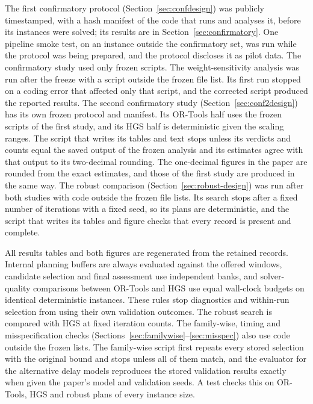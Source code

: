 \documentclass[11pt,a4paper]{article}
\begin{document}
The first confirmatory protocol (Section~\ref{sec:confdesign}) was publicly
timestamped, with a hash manifest of the code that runs and analyses it, before
its instances were solved; its results are in Section~\ref{sec:confirmatory}. One
pipeline smoke test, on an instance outside the confirmatory set, was run while
the protocol was being prepared, and the protocol discloses it as pilot data. The
confirmatory study used only frozen scripts. The weight-sensitivity analysis was
run after the freeze with a script outside the frozen file list. Its first run
stopped on a coding error that affected only that script, and the corrected
script produced the reported results. The second confirmatory study
(Section~\ref{sec:conf2design}) has its own frozen protocol and manifest. Its
OR-Tools half uses the frozen scripts of the first study, and its HGS half is
deterministic given the scaling ranges. The script that writes its tables and
text stops unless its verdicts and counts equal the saved output of the frozen
analysis and its estimates agree with that output to its two-decimal rounding.
The one-decimal figures in the paper are rounded from the exact estimates, and
those of the first study are produced in the same way. The robust comparison (Section~\ref{sec:robust-design}) was run after both studies
with code outside the frozen file lists. Its search stops after a fixed number of
iterations with a fixed seed, so its plans are deterministic, and the script that
writes its tables and figure checks that every record is present and complete.

All results tables and both figures are regenerated from the retained records. Internal
planning buffers are always evaluated against the offered windows, candidate
selection and final assessment use independent banks, and solver-quality
comparisons between OR-Tools and HGS use equal wall-clock budgets on identical
deterministic instances. These rules stop diagnostics and within-run selection
from using their own validation outcomes. The robust search is compared with HGS
at fixed iteration counts. The family-wise, timing and misspecification checks
(Sections~\ref{sec:familywise}--\ref{sec:misspec}) also use code outside the
frozen lists. The family-wise script first repeats every stored selection with
the original bound and stops unless all of them match, and the evaluator for the
alternative delay models reproduces the stored validation results exactly when
given the paper's model and validation seeds. A test checks this on OR-Tools,
HGS and robust plans of every instance size.
\end{document}
